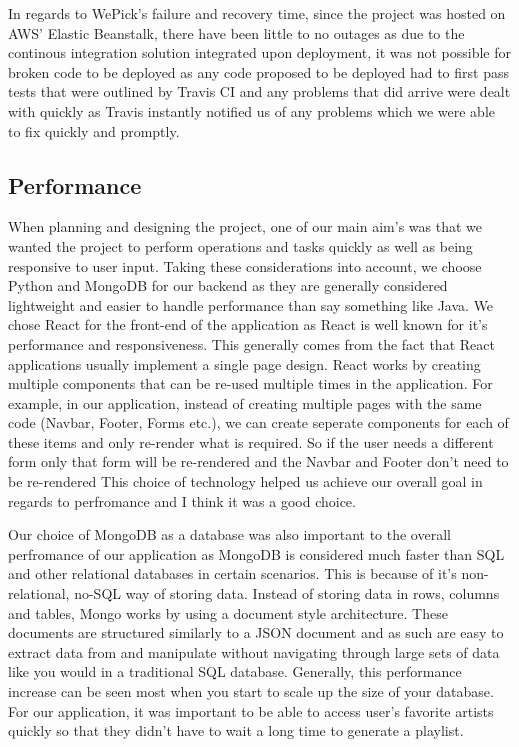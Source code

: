     In regards to WePick's failure and recovery time, since the project was hosted on AWS' Elastic Beanstalk, there have been little to no outages as due 
    to the continous integration solution integrated upon deployment, it was not possible for broken code to be deployed as any code proposed to be deployed had 
    to first pass tests that were outlined by Travis CI and any problems that did arrive were dealt with quickly as Travis instantly notified us of any problems which we were 
    able to fix quickly and promptly.

    \subsection{Performance}
    When planning and designing the project, one of our main aim's was that we wanted the project to perform operations and tasks quickly as well as being responsive to user input. Taking these considerations into account, we choose
    Python and MongoDB for our backend as they are generally considered lightweight and easier to handle performance than say something like Java. We chose React for the front-end of the application as React is well known for it's performance and
    responsiveness. This generally comes from the fact that React applications usually implement a single page design. React works by creating multiple components that can be re-used multiple times in the application. For example, in our 
    application, instead of creating multiple pages with the same code (Navbar, Footer, Forms etc.), we can create seperate components for each of these items and only re-render what is required. So if the user needs a different form only that form will
    be re-rendered and the Navbar and Footer don't need to be re-rendered This choice of technology helped us achieve our overall goal in regards to perfromance and I think it was a good choice.

    Our choice of MongoDB as a database was also important to the overall perfromance of our application as MongoDB is considered much faster than SQL and other relational databases in certain scenarios. This is because of it's non-relational, no-SQL way of storing data.
    Instead of storing data in rows, columns and tables, Mongo works by using a document style architecture. These documents are structured similarly to a JSON document and as such are easy to extract data from and manipulate without navigating through 
    large sets of data like you would in a traditional SQL database. Generally, this performance increase can be seen most when you start to scale up the size of your database. For our application, it was important to be able to access user's favorite artists
    quickly so that they didn't have to wait a long time to generate a playlist.  

